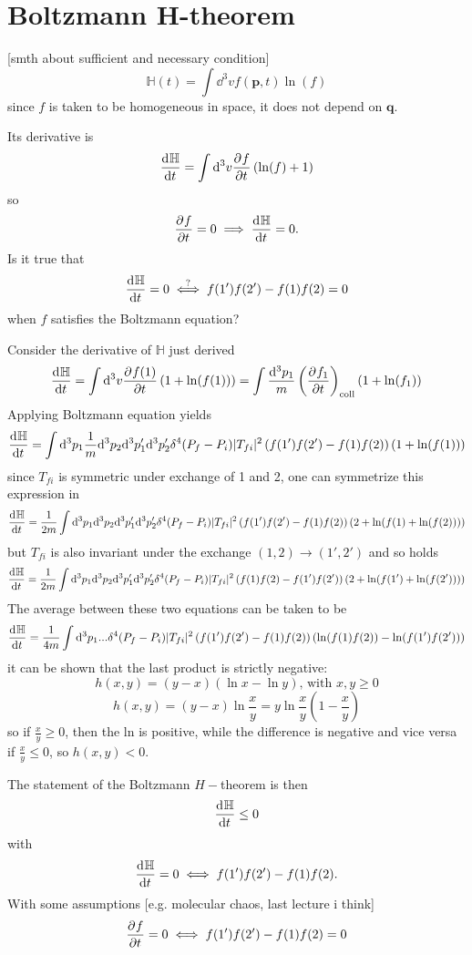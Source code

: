 
\section{Boltzmann H-theorem}
[smth about sufficient and necessary condition]
$$\mathbb{H}(t)=\int \dd^3 v f(\mathbf{p},t)\ln(f)$$
since $f$ is taken to be homogeneous in space, it does not depend on $\mathbf{q}$.

Its derivative is
$$\dv[]{\mathbb{H}}{t} = \int \dd^3v \pdv[]{f}{t}\left(\ln(f)+1\right)$$
so
$$\pdv[]{f}{t} = 0 \implies \dv[]{\mathbb{H}}{t}=0.$$
Is it true that
$$\dv[]{\mathbb{H}}{t}=0\overset{?}\iff f(1')f(2')-f(1)f(2)=0$$
when $f$ satisfies the Boltzmann equation?

Consider the derivative of $\mathbb{H}$ just derived
$$\dv[]{\mathbb{H}}{t} = \int \dd ^3v \pdv[]{f(1)}{t}\left(1+\ln(f(1))\right)=
\int \frac{\dd^3p_1}{m} \left(\pdv[]{f_1}{t}\right)_\text{coll}\left(1+\ln(f_1)
\right)
$$
Applying Boltzmann equation yields
$$\dv[]{\mathbb{H}}{t} = \int \dd^3p_1\frac{1}{m}\dd^3p_2\dd^3p_1'\dd^3p_2'
\delta^4(P_f-P_i) |T_{fi}|^2\left(f(1')f(2')-f(1)f(2)\right)\left(1+\ln(f(1))
\right)$$
since $T_{fi}$ is symmetric under exchange of 1 and 2, one can symmetrize this
expression in
$$\dv[]{\mathbb{H}}{t} = \frac{1}{2m}\int \dd^3p_1\dd^3p_2\dd^3p_1'
\dd^3p_2' \delta^4(P_f-P_i) |T_{fi}|^2\left(f(1')f(2')-f(1)f(2)\right)
\left(2+\ln(f(1)+\ln(f(2)))\right)$$
but $T_{fi}$ is also invariant under the exchange $(1,2)\to(1',2')$ and so holds
$$\dv[]{\mathbb{H}}{t} = \frac{1}{2m}\int \dd^3p_1\dd^3p_2\dd^3p_1'\dd^3p_2'
\delta^4(P_f-P_i) |T_{fi}|^2\left(f(1)f(2)-f(1')f(2')\right)\left(2+\ln(f(1')+
\ln(f(2')))\right)$$
The average between these two equations can be taken to be
$$\dv[]{\mathbb{H}}{t} = \frac{1}{4m}\int \dd ^3p_1...\delta^4(P_f-P_i)
|T_{fi}|^2\left(f(1')f(2')-f(1)f(2)\right)(\ln(f(1)f(2))-\ln(f(1')f(2')))
$$
it can be shown that the last product is strictly negative:
$$h(x,y) = (y-x)(\ln x-\ln y)\text{, with  }x,y\geq0$$
$$h(x,y)=(y-x)\ln\frac{x}{y} = y\ln\frac{x}{y}\left(1-\frac{x}{y}\right)$$
so if $\frac{x}{y}\geq0$, then the ln is positive, while the difference is
negative and vice versa if $\frac{x}{y}\leq0$, so $h(x,y)<0$.

The statement of the Boltzmann $H-$theorem is then
$$\dv[]{\mathbb{H}}{t}\leq0$$
with
$$\dv[]{\mathbb{H}}{t}=0 \iff f(1')f(2')-f(1)f(2).$$
With some assumptions [e.g. molecular chaos, last lecture i think]
$$\pdv[]{f}{t}=0\iff f(1')f(2')-f(1)f(2)=0$$

